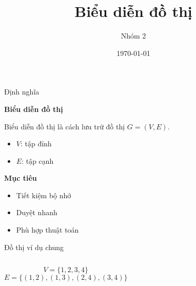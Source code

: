 \documentclass{beamer}
\title{Biểu diễn đồ thị}
\author{Nhóm 2}
\date{\today}
\begin{document}
\frame{\titlepage}

\begin{frame}{Định nghĩa}

\begin{tcolorbox}
\textbf{\faProjectDiagram Biểu diễn đồ thị}

Biểu diễn đồ thị là cách lưu trữ đồ thị $G = (V,E)$.

\begin{itemize}
\item[\faCircle] $V$: tập đỉnh
\item[\faLink] $E$: tập cạnh
\end{itemize}
\end{tcolorbox}

\vspace{0.2cm}

\begin{tcolorbox}
\textbf{\faBullseye Mục tiêu}
\begin{itemize}
\item[\faCheckCircle] Tiết kiệm bộ nhớ
\item[\faBolt] Duyệt nhanh
\item[\faCogs] Phù hợp thuật toán
\end{itemize}
\end{tcolorbox}

\end{frame}

\begin{frame}{Đồ thị ví dụ chung}

\begin{columns}




\begin{tcolorbox}
\[
V=\{1,2,3,4\}
\]
\[
E=\{(1,2),(1,3),(2,4),(3,4)\}
\]
\end{tcolorbox}

\end{columns}

\end{frame}
\end{document}
